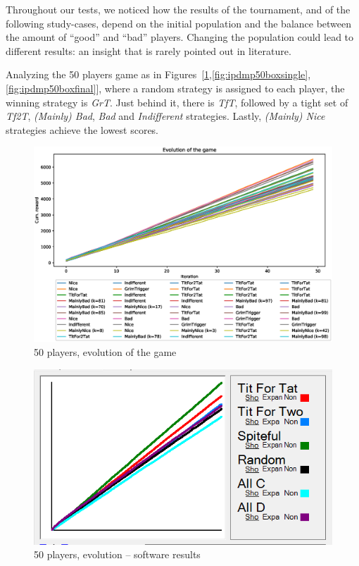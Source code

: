 \documentclass[journal,10pt,twoside]{IEEEtran}
\begin{document}
Throughout our tests, we noticed how the results of the tournament, and of the following study-cases, depend on the initial population and the balance between the amount of ``good'' and ``bad'' players. Changing the population could lead to different results: an insight that is rarely pointed out in literature.

Analyzing the 50 players game as in Figures~[\ref{fig:ipdmp50evo},\ref{fig:ipdmp50boxsingle},\ref{fig:ipdmp50boxfinal}], where a random strategy is assigned to each player, the winning strategy is \textit{GrT}. Just behind it, there is \textit{TfT}, followed by a tight set of \textit{Tf2T}, \textit{(Mainly) Bad}, \textit{Bad} and \textit{Indifferent} strategies. Lastly, \textit{(Mainly) Nice} strategies achieve the lowest scores.

\begin{figure}[!ht]
    \centering
    \includegraphics[width=1\columnwidth]{../img/ipdmp/ipdmp-evolution-of-game-50}
    \caption{50 players, evolution of the game}
    \label{fig:ipdmp50evo}
\end{figure}

\begin{figure}[!ht]
    \centering
    \includegraphics[width=.8\columnwidth]{../img/ipdmp/ipdmp50-plot-det}
    \caption{50 players, evolution -- software results \cite{demosw}}
    \label{fig:ipdmp50evosw}
\end{figure}
\end{document}
